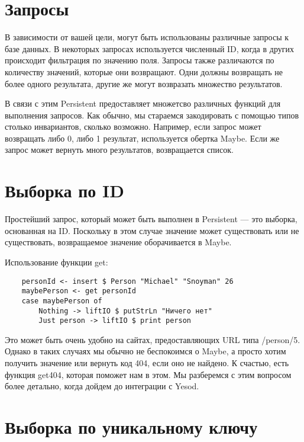 \section{Запросы} %

В зависимости от вашей цели, могут быть использованы различные запросы к базе данных. В некоторых запросах используется численный ID, когда в других происходит фильтрация по значению поля. Запросы также различаются по количеству значений, которые они возвращают. Одни должны возвращать не более одного результата, другие же могут возвразать множество результатов.

В связи с этим Persistent предоставляет множетсво различных функций для выполнения запросов. Как обычно, мы стараемся закодировать с помощью типов столько инвариантов, сколько возможно. Например, если запрос может возвращать либо 0, либо 1 результат, используется обертка Maybe. Если же запрос может вернуть много результатов, возвращается список.

\section{Выборка по ID} %

Простейший запрос, который может быть выполнен в Persistent --- это выборка, основанная на ID. Поскольку в этом случае значение может существовать или не существовать, возвращаемое значение оборачивается в Maybe.

Использование функции get:

\begin{lstlisting}
    personId <- insert $ Person "Michael" "Snoyman" 26
    maybePerson <- get personId
    case maybePerson of
        Nothing -> liftIO $ putStrLn "Ничего нет"
        Just person -> liftIO $ print person
\end{lstlisting}%

Это может быть очень удобно на сайтах, предоставляющих URL типа /person/5. Однако в таких случаях мы обычно не беспокоимся о Maybe, а просто хотим получить значение или вернуть код 404, если оно не найдено. К счастью, есть функция get404, которая поможет нам в этом. Мы разберемся с этим вопросом более детально, когда дойдем до интеграции с Yesod. 

\section{Выборка по уникальному ключу} %

